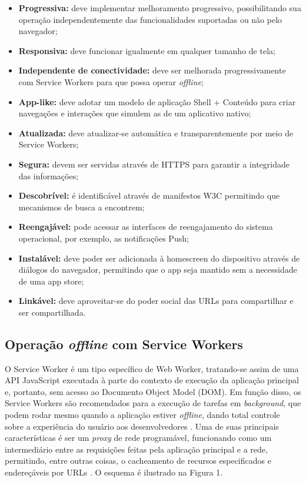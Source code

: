 \documentclass[
	article,			%
	11pt,				%
	oneside,			%
	a4paper,			%
	english,			%
	brazil,				%
	sumario=tradicional
	]{abntex2}
\begin{document}
\begin{itemize}
	\item
	\textbf{Progressiva:} deve implementar melhoramento progressivo, possibilitando sua operação independentemente das funcionalidades suportadas ou não pelo navegador;
	\item
	\textbf{Responsiva:} deve funcionar igualmente em qualquer tamanho de tela;
	\item
	\textbf{Independente de conectividade:} deve ser melhorada progressivamente com Service Workers para que possa operar \textit{offline};
	\item
	\textbf{App-like:} deve adotar um modelo de aplicação Shell + Conteúdo para criar navegações e interações que simulem as de um aplicativo nativo;
	\item
	\textbf{Atualizada:} deve atualizar-se automática e transparentemente por meio de Service Workers;
	\item
	\textbf{Segura:} devem ser servidas através de HTTPS para garantir a integridade das informações;
	\item
	\textbf{Descobrível:} é identificável através de manifestos W3C permitindo que mecanismos de busca a encontrem;
	\item
	\textbf{Reengajável:} pode acessar as interfaces de reengajamento do sistema operacional, por exemplo, as notificações Push;
	\item
	\textbf{Instalável:} deve poder ser adicionada à homescreen do dispositivo através de diálogos do navegador, permitindo que o app seja mantido sem a necessidade de uma app store;
	\item 
	\textbf{Linkável:} deve aproveitar-se do poder social das URLs para compartilhar e ser compartilhada.
\end{itemize}

\subsection{Operação \textit{offline} com Service Workers}

O Service Worker é um tipo específico de Web Worker, tratando-se assim de uma API JavaScript executada à parte do contexto de execução da aplicação principal e, portanto, sem acesso ao Documento Object Model (DOM). Em função disso, os Service Workers são recomendados para a execução de tarefas em \textit{background}, que podem rodar mesmo quando a aplicação estiver \textit{offline}, dando total controle sobre a experiência do usuário aos desenvolvedores \cite{gaunt-2017}. Uma de suas principais características é ser um \textit{proxy} de rede programável, funcionando como um intermediário entre as requisições feitas pela aplicação principal e a rede, permitindo, entre outras coisas, o cacheamento de recursos especificados e endereçáveis por URLs \cite{gaunt-2017}. O esquema é ilustrado na Figura 1.
\end{document}
